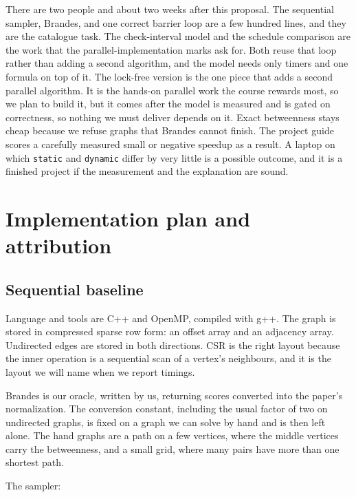 \documentclass[11pt]{article}
\begin{document}
There are two people and about two weeks after this proposal. The sequential sampler, Brandes, and one correct barrier loop are a few hundred lines, and they are the catalogue task. The check-interval model and the schedule comparison are the work that the parallel-implementation marks ask for. Both reuse that loop rather than adding a second algorithm, and the model needs only timers and one formula on top of it. The lock-free version is the one piece that adds a second parallel algorithm. It is the hands-on parallel work the course rewards most, so we plan to build it, but it comes after the model is measured and is gated on correctness, so nothing we must deliver depends on it. Exact betweenness stays cheap because we refuse graphs that Brandes cannot finish. The project guide scores a carefully measured small or negative speedup as a result. A laptop on which \texttt{static} and \texttt{dynamic} differ by very little is a possible outcome, and it is a finished project if the measurement and the explanation are sound.

\section{Implementation plan and attribution}
\label{sec:plan}

\subsection{Sequential baseline}
\label{sec:plan-baseline}

Language and tools are C++ and OpenMP, compiled with g++. The graph is stored in compressed sparse row form: an offset array and an adjacency array. Undirected edges are stored in both directions. CSR is the right layout because the inner operation is a sequential scan of a vertex's neighbours, and it is the layout we will name when we report timings.

Brandes is our oracle, written by us, returning scores converted into the paper's normalization. The conversion constant, including the usual factor of two on undirected graphs, is fixed on a graph we can solve by hand and is then left alone. The hand graphs are a path on a few vertices, where the middle vertices carry the betweenness, and a small grid, where many pairs have more than one shortest path.

The sampler:
\end{document}

